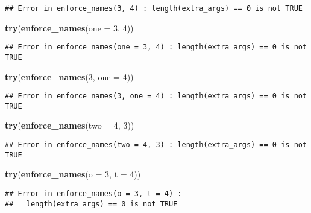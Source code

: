 \documentclass[]{book}
\newenvironment{Shaded}{\begin{snugshade}}{\end{snugshade}}
\newcommand{\DataTypeTok}[1]{\textcolor[rgb]{0.13,0.29,0.53}{#1}}
\newcommand{\DecValTok}[1]{\textcolor[rgb]{0.00,0.00,0.81}{#1}}
\newcommand{\KeywordTok}[1]{\textcolor[rgb]{0.13,0.29,0.53}{\textbf{#1}}}
\newcommand{\NormalTok}[1]{#1}
\begin{document}
\begin{enumerate}
\begin{verbatim}
## Error in enforce_names(3, 4) : length(extra_args) == 0 is not TRUE
\end{verbatim}

\begin{Shaded}
\begin{Highlighting}[]
\KeywordTok{try}\NormalTok{(}\KeywordTok{enforce_names}\NormalTok{(}\DataTypeTok{one =} \DecValTok{3}\NormalTok{, }\DecValTok{4}\NormalTok{))}
\end{Highlighting}
\end{Shaded}

\begin{verbatim}
## Error in enforce_names(one = 3, 4) : length(extra_args) == 0 is not TRUE
\end{verbatim}

\begin{Shaded}
\begin{Highlighting}[]
\KeywordTok{try}\NormalTok{(}\KeywordTok{enforce_names}\NormalTok{(}\DecValTok{3}\NormalTok{, }\DataTypeTok{one =} \DecValTok{4}\NormalTok{))}
\end{Highlighting}
\end{Shaded}

\begin{verbatim}
## Error in enforce_names(3, one = 4) : length(extra_args) == 0 is not TRUE
\end{verbatim}

\begin{Shaded}
\begin{Highlighting}[]
\KeywordTok{try}\NormalTok{(}\KeywordTok{enforce_names}\NormalTok{(}\DataTypeTok{two =} \DecValTok{4}\NormalTok{, }\DecValTok{3}\NormalTok{))}
\end{Highlighting}
\end{Shaded}

\begin{verbatim}
## Error in enforce_names(two = 4, 3) : length(extra_args) == 0 is not TRUE
\end{verbatim}

\begin{Shaded}
\begin{Highlighting}[]
\KeywordTok{try}\NormalTok{(}\KeywordTok{enforce_names}\NormalTok{(}\DataTypeTok{o =} \DecValTok{3}\NormalTok{, }\DataTypeTok{t =} \DecValTok{4}\NormalTok{))}
\end{Highlighting}
\end{Shaded}

\begin{verbatim}
## Error in enforce_names(o = 3, t = 4) : 
##   length(extra_args) == 0 is not TRUE
\end{verbatim}


\end{enumerate}
\end{document}
